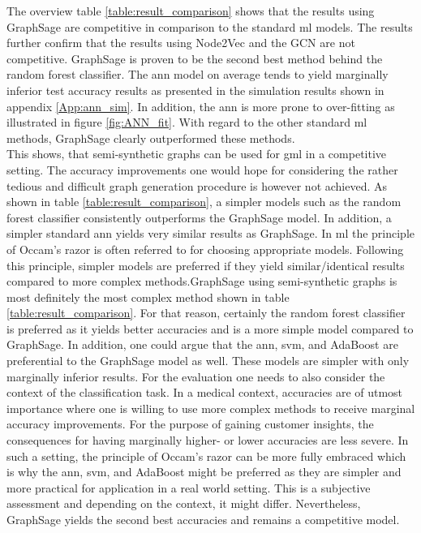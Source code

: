   The overview table \ref{table:result_comparison} shows that the results using 
  GraphSage are competitive in comparison to the standard \acs{ml} models. The 
  results further confirm that the results using Node2Vec and the GCN are not 
  competitive. GraphSage is proven to be the second best method behind the 
  random forest classifier. The \acs{ann} model on average tends to yield 
  marginally inferior test accuracy results as presented in the simulation results 
  shown in appendix \ref{App:ann_sim}. In addition, the \acs{ann} is more prone to 
  over-fitting as illustrated in figure \ref{fig:ANN_fit}. With regard to the other 
  standard \acs{ml} methods, GraphSage clearly outperformed these methods. \\

  \noindent This shows, that semi-synthetic graphs can be used for \acs{gml} in 
  a competitive setting. The accuracy improvements one would hope for 
  considering the rather tedious and difficult graph generation procedure is 
  however not achieved. As shown in table \ref{table:result_comparison}, a 
  simpler models such as the random forest classifier consistently outperforms 
  the GraphSage model. In addition, a simpler standard \acs{ann} yields very 
  similar results as GraphSage. In \acs{ml} the principle of Occam's razor is 
  often referred to for choosing appropriate models. Following this principle, 
  simpler models are preferred if they yield similar/identical results compared 
  to more complex methods.GraphSage using semi-synthetic graphs is most 
  definitely the most complex method shown in table \ref{table:result_comparison}. 
  For that reason, certainly the random forest classifier is preferred as it 
  yields better accuracies and is a more simple model compared to GraphSage. In 
  addition, one could argue that the \acs{ann}, \acs{svm}, and AdaBoost are 
  preferential to the GraphSage model as well. These models are simpler with 
  only marginally inferior results. For the evaluation one needs to also consider 
  the context of the classification task. In a medical context, accuracies are 
  of utmost importance where one is willing to use more complex methods to 
  receive marginal accuracy improvements. For the purpose of gaining customer 
  insights, the consequences for having marginally higher- or lower accuracies 
  are less severe. In such a setting, the principle of Occam's razor can be more 
  fully embraced which is why the \acs{ann}, \acs{svm}, and AdaBoost might be 
  preferred as they are simpler and more practical for application in a 
  real world setting. This is a subjective assessment and depending on the 
  context, it might differ. Nevertheless, GraphSage yields the second best 
  accuracies and remains a competitive model. \\ 

